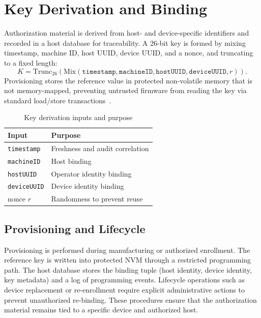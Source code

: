 \section{Key Derivation and Binding}
Authorization material is derived from host- and device-specific identifiers and recorded
in a host database for traceability. A 26-bit key is formed by mixing timestamp, machine
ID, host UUID, device UUID, and a nonce, and truncating to a fixed length:
\begin{equation}
K=\mathrm{Trunc}_{26}\left(\mathrm{Mix}(\texttt{timestamp},\texttt{machineID},\texttt{hostUUID},\texttt{deviceUUID},r)\right).
\end{equation}
Provisioning stores the reference value in protected non-volatile memory that is not
memory-mapped, preventing untrusted firmware from reading the key via standard
load/store transactions~\cite{bin2020bootrom,rv2018securebootreview,jaeger2020diceharder}.

\begin{table}[H]
  \centering
  \caption{Key derivation inputs and purpose}
  \label{tab:key-derivation}
  \begin{tabular}{@{}p{3.4cm}p{6.8cm}@{}}
    \toprule
    \textbf{Input} & \textbf{Purpose} \\
    \midrule
    \texttt{timestamp} & Freshness and audit correlation \\
    \texttt{machineID} & Host binding \\
    \texttt{hostUUID} & Operator identity binding \\
    \texttt{deviceUUID} & Device identity binding \\
    nonce \(r\) & Randomness to prevent reuse \\
    \bottomrule
  \end{tabular}
\end{table}

\subsection{Provisioning and Lifecycle}
Provisioning is performed during manufacturing or authorized enrollment. The reference key
is written into protected NVM through a restricted programming path. The host database stores
the binding tuple (host identity, device identity, key metadata) and a log of programming
events. Lifecycle operations such as device replacement or re-enrollment require explicit
administrative actions to prevent unauthorized re-binding. These procedures ensure that the
authorization material remains tied to a specific device and authorized host.

